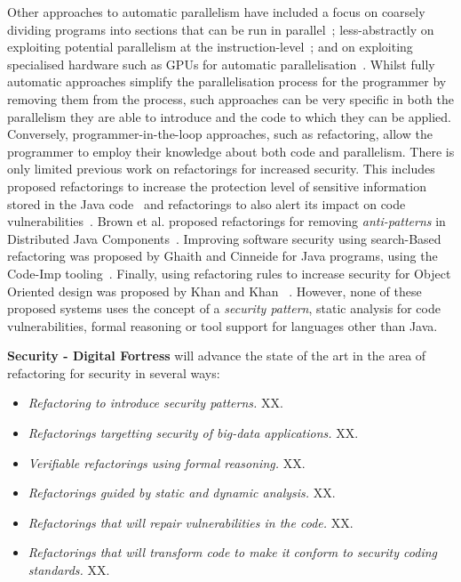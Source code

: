 \documentclass[a4paper,11pt]{article}
\newcommand{\project}[1]{\textbf{#1}\xspace}
\newcommand{\SECURITY}{\project{Security - Digital Fortress}}
\newcommand{\TheProject}{\SECURITY}
\begin{document}
%
Other approaches to automatic parallelism have included a focus on coarsely dividing programs into sections that can be run in parallel~\cite{DBLP:conf/pepm/LiT15,DBLP:conf/ppopp/RulVB08}; less-abstractly on exploiting potential parallelism at the instruction-level~\cite{DBLP:conf/europar/StefanovicM00}; and on exploiting specialised hardware such as GPUs for automatic parallelisation~\cite{DBLP:conf/popl/GuoTS11,DBLP:conf/pppj/LeungLL09}.
% 
%
Whilst fully automatic approaches simplify the parallelisation process for the programmer by removing them from the process, such approaches can be very specific in both the parallelism they are able to introduce and the code to which they can be applied. Conversely, programmer-in-the-loop approaches, such as refactoring, allow the programmer to employ their knowledge about both code and parallelism.
%
There is only limited previous work on refactorings for increased security. This includes proposed refactorings to increase the protection level of sensitive information stored in the Java code~\cite{maru2007} and refactorings to also alert its impact on code vulnerabilities~\cite{maru2008}.
Brown et al. proposed refactorings for removing \emph{anti-patterns} in Distributed Java Components~\cite{brown1998antipatterns}.  Improving software security using search-Based refactoring was proposed by Ghaith and Cinneide for Java programs, using the Code-Imp tooling~\cite{ghaith}. Finally, using refactoring rules to increase security for Object Oriented design was proposed by Khan and Khan~\cite{khan} . However, none of these proposed systems uses the concept of a \emph{security pattern}, static analysis for code vulnerabilities, formal reasoning or tool support for languages other than Java. 
 
\begin{mdframed}[backgroundcolor=gray!10]
\TheProject{} will advance the state of the art in the area of refactoring for security in several ways:
\begin{itemize}
\item \emph{Refactoring to introduce security patterns.} XX.
\item \emph{Refactorings targetting security of big-data applications.} XX.
\item \emph{Verifiable refactorings using formal reasoning.} XX.
\item \emph{Refactorings guided by static and dynamic analysis.} XX.
\item \emph{Refactorings that will repair vulnerabilities in the code.} XX.
\item \emph{Refactorings that will transform code to make it conform to security coding standards.} XX.
\end{itemize}
\end{mdframed}
\end{document}
